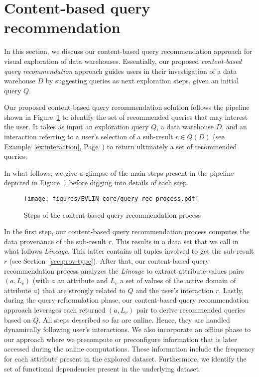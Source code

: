 \section{Content-based query recommendation}
\label{sec:content-query-rec}
\sloppy
In this section, we discuss our content-based query recommendation approach for visual exploration of data warehouses.
Essentially, our proposed \emph{content-based query recommendation} approach guides users in their investigation of a data warehouse $D$ by suggesting queries as next exploration steps, given an initial query $Q$.




Our proposed content-based query recommendation solution follows the pipeline shown in Figure~\ref{fig:query-rec-process} to identify the set of recommended queries that may interest the user. 
It takes as input an exploration query $Q$, a data warehouse $D$, and an interaction referring to a user's selection of a sub-result $r \in Q(D)$ (see Example~\ref{ex:interaction}, Page~\pageref{ex:interaction}) to return ultimately a set of recommended queries.

In what follows, we give a glimpse of the main steps present in the pipeline depicted in Figure~\ref{fig:query-rec-process} before digging into details of each step.
\begin{figure}[t]
\centering
\texttt{[image: figures/EVLIN-core/query-rec-process.pdf]}
\caption{Steps of the content-based query recommendation process}
\label{fig:query-rec-process}
\end{figure}



In the first step, our content-based query recommendation process computes the data provenance of the sub-result $r$. 
This results in a data set that we call in what follows \emph{Lineage}. This latter contains all tuples involved to get the sub-result $r$ (see Section~\ref{sec:prov-type}).
After that, our content-based query recommendation process analyzes the \emph{Lineage} to extract attribute-values pairs $(a, L_v)$  (with $a$ an attribute and $L_v$ a set of values of the active domain of attribute $a$) that are strongly related to $Q$ and the user's interaction $r$. 
Lastly, during the query reformulation phase, our content-based query recommendation approach leverages each returned $(a, L_v)$ pair to derive recommended queries based on $Q$. 
All steps described so far are online. Hence, they are handled dynamically following user's interactions. We also incorporate an offline phase to our approach where we precompute or preconfigure information that is later accessed during the online computations. These information include the frequency for each attribute present in the explored dataset. Furthermore, we identify the set of functional dependencies present in the underlying dataset.



